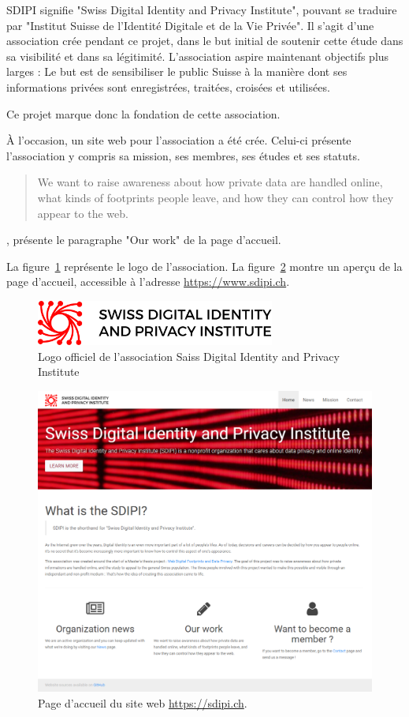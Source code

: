 SDIPI signifie "Swiss Digital Identity and Privacy Institute", pouvant se traduire par "Institut Suisse de l'Identité Digitale et de la Vie Privée". Il s'agit d'une association crée pendant ce projet, dans le but initial de soutenir cette étude dans sa visibilité et dans sa légitimité. L'association aspire maintenant objectifs plus larges : Le but est de sensibiliser le public Suisse à la manière dont ses informations privées sont enregistrées, traitées, croisées et utilisées.

Ce projet marque donc la fondation de cette association. 

À l'occasion, un site web pour l'association a été crée. Celui-ci présente l'association y compris sa mission, ses membres, ses études et ses statuts.

\blockquote{We want to raise awareness about how private data are handled online, what kinds of footprints people leave, and how they can control how they appear to the web.}, présente le paragraphe "Our work" de la page d'accueil.

La figure~\ref{a-sdipi-logo} représente le logo de l'association. La figure~\ref{a-sdipi} montre un aperçu de la page d'accueil, accessible à l'adresse \url{https://www.sdipi.ch}.

\begin{figure}[h]
	\centering
	\includegraphics[width=0.7\textwidth]{images/annexes/logo_sdipi}
	\caption{Logo officiel de l'association Saiss Digital Identity and Privacy Institute}
	\label{a-sdipi-logo}
\end{figure}

\begin{figure}[h]
	\centering
	\includegraphics[width=1\textwidth]{images/design/sdipi_home}
	\caption{Page d'accueil du site web \url{https://sdipi.ch}.}
	\label{a-sdipi}
\end{figure}